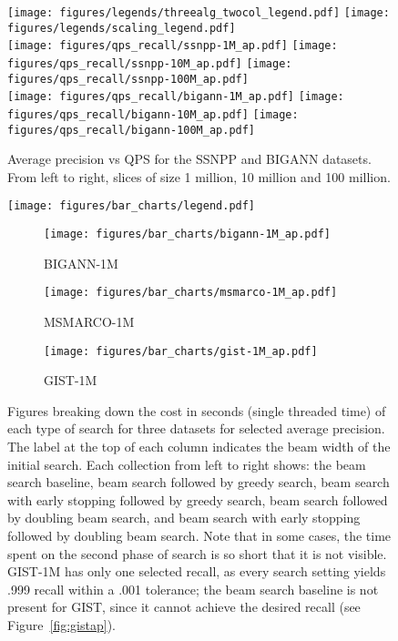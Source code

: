 \begin{figure}
	\texttt{[image: figures/legends/threealg\_twocol\_legend.pdf]} 
	\texttt{[image: figures/legends/scaling\_legend.pdf]} \\
	\texttt{[image: figures/qps\_recall/ssnpp-1M\_ap.pdf]}
	\texttt{[image: figures/qps\_recall/ssnpp-10M\_ap.pdf]}
	\texttt{[image: figures/qps\_recall/ssnpp-100M\_ap.pdf]} \\
	\texttt{[image: figures/qps\_recall/bigann-1M\_ap.pdf]}
	\texttt{[image: figures/qps\_recall/bigann-10M\_ap.pdf]}
	\texttt{[image: figures/qps\_recall/bigann-100M\_ap.pdf]} \\
	\caption{Average precision vs QPS for the SSNPP and BIGANN datasets. From left to right, slices of size 1 million, 10 million and 100 million.}
	\label{fig:sizescaling}
\end{figure}

\begin{figure*}
		\texttt{[image: figures/bar\_charts/legend.pdf]}
	\begin{subfigure}{.32\textwidth}
		\texttt{[image: figures/bar\_charts/bigann-1M\_ap.pdf]}
		\caption{BIGANN-1M}\label{fig:bigannbar}
	\end{subfigure}
	\begin{subfigure}{.32\textwidth}
		\texttt{[image: figures/bar\_charts/msmarco-1M\_ap.pdf]}
		\caption{MSMARCO-1M}\label{fig:msmarcobar}
	\end{subfigure}
	\begin{subfigure}{.32\textwidth}
		\texttt{[image: figures/bar\_charts/gist-1M\_ap.pdf]}
		\caption{GIST-1M}\label{fig:gistbar}
	\end{subfigure}
	\caption{Figures breaking down the cost in seconds (single threaded time) of each type of search for three datasets for selected average precision. The label at the top of each column indicates the beam width of the initial search. Each collection from left to right shows: the beam search baseline, beam search followed by greedy search, beam search with early stopping followed by greedy search, beam search followed by doubling beam search, and beam search with early stopping followed by doubling beam search. Note that in some cases, the time spent on the second phase of search is so short that it is not visible. GIST-1M has only one selected recall, as every search setting yields .999 recall within a .001 tolerance; the beam search baseline is not present for GIST, since it cannot achieve the desired recall (see Figure~\ref{fig:gistap}).}\label{fig:barchart}
\end{figure*}

